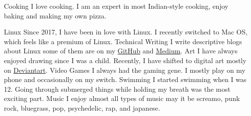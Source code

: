 



\begin{cvskills}
  \cvskill
    {Cooking} %
    {I love cooking. I am an expert in most Indian-style cooking, enjoy baking and making my own pizza.} %

  \cvskill
    {Linux} %
    {Since 2017, I have been in love with Linux. I recently switched to Mac OS, which feels like a premium of Linux.} %
  \cvskill
    {Technical Writing} %
    {I write descriptive blogs about Linux some of them are on my \href{https://github.com/themagicalmammal/howtodebuntu}{GitHub} and \href{https://medium.com/@d19cyber}{Medium}.} %
  \cvskill
    {Art} %
    {I have always enjoyed drawing since I was a child. Recently, I have shifted to digital art mostly on \href{https://www.deviantart.com/themagicalmammal}{Deviantart}.} %
  \cvskill
    {Video Games} %
    {I always had the gaming gene. I mostly play on my phone and occasionally on my switch.} %
  \cvskill
    {Swimming} %
    {I started swimming when I was 12. Going through submerged things while holding my breath was the most exciting part.} %
  \cvskill
    {Music} %
    {I enjoy almost all types of music may it be screamo, punk rock, bluegrass, pop, psychedelic, rap, and japanese. } %

\end{cvskills}